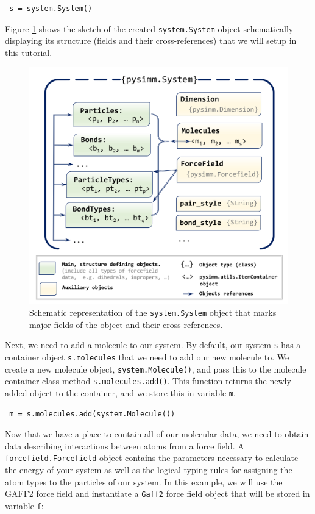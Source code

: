 \documentclass[9pt,tutorial]{livecoms}
\begin{document}
\begin{lstlisting}
 s = system.System()
\end{lstlisting}
Figure \ref{sstm-scheme} shows the sketch of the created \lstinline$system.System$ object schematically displaying its structure (fields and their cross-references) that we will setup in this tutorial.

\begin{figure}[htbp]
  \centering
    \includegraphics[width=0.95\columnwidth]{figures/figure1}
    \caption{Schematic representation of the \lstinline$system.System$ object that marks major fields of the object and their cross-references.}
    \label{sstm-scheme}
\end{figure}

Next, we need to add a molecule to our system. By default, our system \lstinline$s$ has a container object \lstinline$s.molecules$ that we need to add our new molecule to. We create a new molecule object, \lstinline$system.Molecule()$, and pass this to the molecule container class method \lstinline$s.molecules.add()$. This function returns the newly added object to the container, and we store this in variable \lstinline$m$.

\begin{lstlisting}
 m = s.molecules.add(system.Molecule())
\end{lstlisting}

Now that we have a place to contain all of our molecular data, we need to obtain data describing interactions between atoms from a force field. A \lstinline$forcefield.Forcefield$ object contains the parameters necessary to calculate the energy of your system as well as the logical typing rules for assigning the atom types to the particles of our system. In this example, we will use the GAFF2 force field and instantiate a \lstinline$Gaff2$ force field object that will be stored in variable \lstinline$f$:
\end{document}
